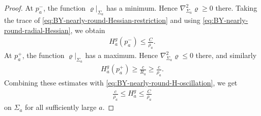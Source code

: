 \documentclass[10pt]{amsart}
\theoremstyle{plain}
\theoremstyle{remark}
\begin{document}
\begin{proof}
		At $p_a^-$, the function $\varrho|_{\Sigma_a}$ has a minimum.
		Hence $\nabla_{\Sigma_a}^2\varrho\geq0$ there. Taking the trace of
		\eqref{eq:BY-nearly-round-Hessian-restriction} and using
		\eqref{eq:BY-nearly-round-radial-Hessian}, we obtain
		\begin{align*}
			H_a^g(p_a^-)
			\leq
			\frac{C}{\rho_a}.
		\end{align*}
		At $p_a^+$, the function $\varrho|_{\Sigma_a}$ has a maximum.
		Hence $\nabla_{\Sigma_a}^2\varrho\leq0$ there, and similarly
		\begin{align*}
			H_a^g(p_a^+)
			\geq
			\frac{c}{R_a}
			\geq
			\frac{c}{\rho_a}.
		\end{align*}
		Combining these estimates with \eqref{eq:BY-nearly-round-H-oscillation}, we
		get
		\begin{align}\label{eq:BY-nearly-round-H-scale}
			\frac{c}{\rho_a}
			\leq
			H_a^g
			\leq
			\frac{C}{\rho_a}
		\end{align}
		on $\Sigma_a$ for all sufficiently large $a$. 
		

\end{proof}
\end{document}
